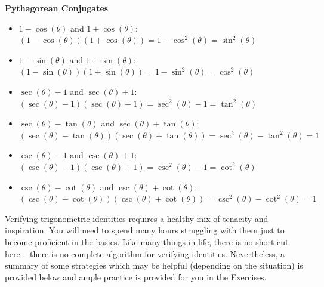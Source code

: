 \smallskip

\label{PythagoreanConjugates}
\smallskip
\colorbox{ResultColor}{\bbm

\smallskip

\centerline{\textbf{Pythagorean Conjugates}}  

\begin{itemize}

\item $1 - \cos(\theta)$ and  $1+\cos(\theta)$:  $(1-\cos(\theta))(1+\cos(\theta)) = 1 - \cos^{2}(\theta) = \sin^{2}(\theta)$

\item  $1-\sin(\theta)$ and $1 + \sin(\theta)$:  $(1-\sin(\theta))(1+\sin(\theta)) = 1 - \sin^{2}(\theta) = \cos^{2}(\theta)$

\item  $\sec(\theta)-1$ and $\sec(\theta)+1$:  $(\sec(\theta)-1)(\sec(\theta)+1) = \sec^{2}(\theta) - 1 =  \tan^{2}(\theta)$

\item  $\sec(\theta)-\tan(\theta)$ and $\sec(\theta)+\tan(\theta)$:  $(\sec(\theta)-\tan(\theta))(\sec(\theta)+\tan(\theta)) = \sec^{2}(\theta) - \tan^{2}(\theta) = 1$

\item  $\csc(\theta)-1$ and $\csc(\theta)+1$:  $(\csc(\theta)-1)(\csc(\theta)+1) = \csc^{2}(\theta) - 1 =  \cot^{2}(\theta)$

\item  $\csc(\theta)-\cot(\theta)$ and $\csc(\theta)+\cot(\theta)$:  $(\csc(\theta)-\cot(\theta))(\csc(\theta)+\cot(\theta)) = \csc^{2}(\theta) - \cot^{2}(\theta) = 1$

\smallskip

\end{itemize}

\ebm}

Verifying trigonometric identities requires a healthy mix of tenacity and inspiration.  You will need to spend many hours struggling with them just to become proficient in the basics.  Like many things in life, there is no short-cut here -- there is no complete algorithm for verifying identities.  Nevertheless, a summary of some strategies which  may be helpful (depending on the situation) is provided below and ample practice is provided for you in the Exercises.

\label{IdentityHelp}

